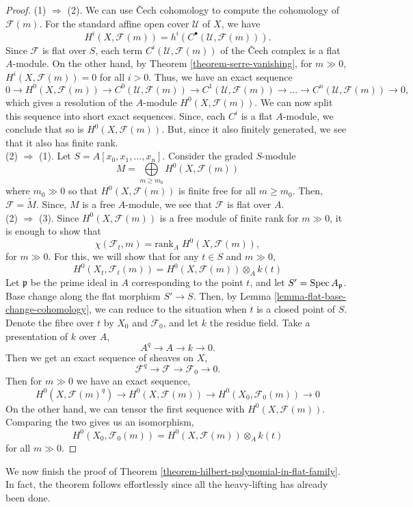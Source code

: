 \documentclass[11pt]{amsart}
\newcommand{\Spec}{{\rm Spec \,}}
\renewcommand{\tilde}{\widetilde}
\newcommand{\sF}{{\mathcal F}}
\newcommand{\sU}{{\mathcal U}}
\theoremstyle{definition}
\begin{document}
\begin{proof}
	(1) $\Rightarrow$ (2). We can use \v{C}ech cohomology to compute the cohomology of $\sF(m)$. For the standard affine open cover $\sU$ of $X$, we have
	\[H^i(X,\sF(m))=h^i(C^{\bullet}(\sU,\sF(m))).\]
	Since $\sF$ is flat over $S$, each term $C^{i}(\sU,\sF(m))$ of the \v{C}ech complex is a flat $A$-module. On the other hand, by Theorem \ref{theorem-serre-vanishing}, for $m\gg 0$, $H^i(X,\sF(m))=0$ for all $i>0$. Thus, we have an exact sequence
	\[0\rightarrow H^0(X,\sF(m))\rightarrow C^{0}(\sU,\sF(m))\rightarrow C^{1}(\sU,\sF(m))\rightarrow \ldots \rightarrow C^{n}(\sU,\sF(m))\rightarrow 0,\]
	which gives a resolution of the $A$-module $H^0(X,\sF(m))$. We can now split this sequence into short exact sequences. Since, each $C^i$ is a flat $A$-module, we conclude that so is $H^0(X,\sF(m))$. But, since it also finitely generated, we see that it also has finite rank.\\
	(2) $\Rightarrow$ (1). Let $S=A[x_0,x_1,\ldots,x_n]$. Consider the graded $S$-module
	\[M=\underset{m\geq m_0}{\bigoplus}H^0(X,\sF(m))\]
	where $m_0\gg 0$ so that $H^0(X,\sF(m))$ is finite free for all $m\geq m_0$. Then, $\sF=\tilde{M}$. Since, $M$ is a free $A$-module, we see that $\sF$ is flat over $A$.\\
	(2) $\Rightarrow$ (3). Since $H^0(X,\sF(m))$ is a free module of finite rank for $m\gg 0$, it is enough to show that
	\[\chi(\sF_t,m)=\text{rank}_A\; H^0(X,\sF(m)),\]
	for $m\gg 0$.	For this, we will show that for any $t\in S$ and $m\gg 0$,
	\[H^0(X_t,\sF_t(m))=H^0(X,\sF(m)) \otimes_A k(t)\]
	Let $\mathfrak{p}$ be the prime ideal in $A$ corresponding to the point $t$, and let $S'=\Spec A_{\mathfrak{p}}$. Base change along the flat morphism $S'\rightarrow S$. Then, by Lemma \ref{lemma-flat-base-change-cohomology}, we can reduce to the situation when $t$ is a closed point of $S$. Denote the fibre over $t$ by $X_0$ and $\sF_0$, and let $k$ the residue field. Take a presentation of $k$ over $A$,
	\[A^q\rightarrow A\rightarrow k\rightarrow 0.\]
	Then we get an exact sequence of sheaves on $X$,
	\[\sF^q\rightarrow \sF \rightarrow \sF_0\rightarrow 0.\]
	Then for $m\gg 0$ we have an exact sequence,
	\[H^0(X,\sF(m)^q)\rightarrow H^0(X,\sF(m))\rightarrow H^0(X_0,\sF_0(m)) \rightarrow 0\]
	On the other hand, we can tensor the first sequence with $H^0(X,\sF(m))$. Comparing the two gives us an isomorphism,
	\[H^0(X_0,\sF_0(m))=H^0(X,\sF(m)) \otimes_A k(t)\]
	for all $m\gg 0$.
\end{proof}

We now finish the proof of Theorem \ref{theorem-hilbert-polynomial-in-flat-family}. In fact, the theorem follows effortlessly since all the heavy-lifting has already  been done.
\end{document}
